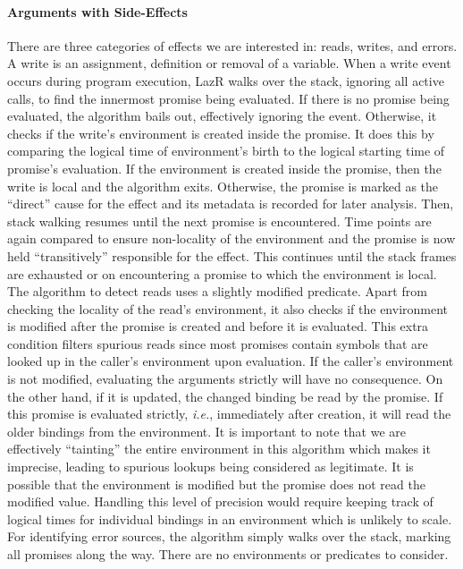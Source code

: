 \documentclass[review,nonacm,screen,acmsmall,anonymous=true]{acmart}
\newcommand{\lazr}{{\sf LazR}\xspace}
\begin{document}
\paragraph{Arguments with Side-Effects}

There are three categories of effects we are interested in: reads, writes, and
errors.
A write is an
assignment, definition or removal of a variable. When a write event occurs
during program execution, \lazr walks over the stack, ignoring all active calls,
to find the innermost promise being evaluated. If there is no promise being
evaluated, the algorithm bails out, effectively ignoring the event. Otherwise,
it checks if the write's environment is created inside the promise. It does this
by comparing the logical time of environment's birth to the logical starting
time of promise's evaluation. If the environment is created inside the promise,
then the write is local and the algorithm exits. Otherwise, the promise is
marked as the ``direct'' cause for the effect and its metadata is recorded for
later analysis. Then, stack walking resumes until the next promise is
encountered. Time points are again compared to ensure non-locality of the
environment and the promise is now held ``transitively'' responsible for the
effect. This continues until the stack frames are exhausted or on encountering a
promise to which the environment is local. The algorithm to detect reads uses a
slightly modified predicate. Apart from checking the locality of the read's
environment, it also checks if the environment is modified after the promise is
created and before it is evaluated. This extra condition filters spurious reads
since most promises contain symbols that are looked up in the caller's
environment upon evaluation. If the caller's environment is not modified,
evaluating the arguments strictly will have no consequence. On the other hand,
if it is updated, the changed binding be read by the promise. If this promise is
evaluated strictly, \textit{i.e.}, immediately after creation, it will read the
older bindings from the environment. It is important to note that we are
effectively ``tainting'' the entire environment in this algorithm which makes it
imprecise, leading to spurious lookups being considered as legitimate. It is
possible that the environment is modified but the promise does not read the
modified value. Handling this level of precision would require keeping track of
logical times for individual bindings in an environment which is unlikely to
scale.
%
For identifying error sources, the algorithm simply walks over the stack,
marking all promises along the way. There are no environments or predicates to
consider.
\end{document}
